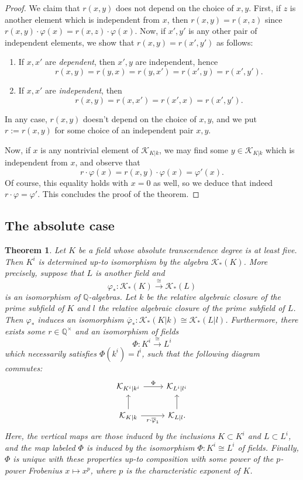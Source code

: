 \documentclass[12pt]{amsart}
\newcommand{\Qbb}{\mathbb{Q}}
\newcommand{\Kcal}{\mathcal{K}}
\renewcommand{\bar}{\overline}
\renewcommand{\phi}{\varphi}
\newtheorem{theorem}{Theorem}[section]
\theoremstyle{definition}
\begin{document}
\begin{proof}
  We claim that $r(x,y)$ does not depend on the choice of $x,y$.
  First, if $z$ is another element which is independent from $x$, then $r(x,y) = r(x,z)$ since $r(x,y) \cdot \phi(x) = r(x,z) \cdot \phi(x)$.
  Now, if $x',y'$ is any other pair of independent elements, we show that $r(x,y) = r(x',y')$ as follows:
  \begin{enumerate}
    \item If $x,x'$ are \emph{dependent}, then $x',y$ are independent, hence
          \[ r(x,y) = r(y,x) = r(y,x') = r(x',y) = r(x',y'). \]
    \item If $x,x'$ are \emph{independent}, then
          \[ r(x,y) = r(x,x') = r(x',x) = r(x',y'). \]
  \end{enumerate}
  In any case, $r(x,y)$ doesn't depend on the choice of $x,y$, and we put $r := r(x,y)$ for some choice of an independent pair $x,y$.

  Now, if $x$ is any nontrivial element of $\Kcal_{K|k}$, we may find some $y \in \Kcal_{K|k}$ which is independent from $x$, and observe that
  \[ r \cdot \phi(x) = r(x,y) \cdot \phi(x) = \phi'(x). \]
  Of course, this equality holds with $x = 0$ as well, so we deduce that indeed $r \cdot \phi = \phi'$.
  This concludes the proof of the theorem.
\end{proof}

\subsection{The absolute case}

\begin{theorem}\label{theorem:main_absolute_Kcal}
  Let $K$ be a field whose absolute transcendence degree is at least five.
  Then $K^{i}$ is determined up-to isomorphism by the algebra $\Kcal_{*}(K)$.
  More precisely, suppose that $L$ is another field and
  \[ \phi_{*} : \Kcal_{*}(K) \xrightarrow{\cong} \Kcal_{*}(L) \]
  is an isomorphism of $\Qbb$-algebras.
  Let $k$ be the relative algebraic closure of the prime subfield of $K$ and $l$ the relative algebraic closure of the prime subfield of $L$.
  Then $\phi_{*}$ induces an isomorphism $\bar\phi_{*} : \Kcal_{*}(K|k) \cong \Kcal_{*}(L|l)$.
  Furthermore, there exists some $r \in \Qbb^{\times}$ and an isomorphism of fields
  \[ \Phi : K^{i} \xrightarrow{\cong} L^{i} \]
  which necessarily satisfies $\Phi(k^{i}) = l^{i}$, such that the following diagram commutes:
  \[ \begin{tikzcd}
      \Kcal_{K^{i}|k^{i}} \ar[r,"\Phi"] & \Kcal_{L^{i}|l^{i}} \\
      \Kcal_{K|k} \ar[u] \ar[r,"r \cdot \bar\phi_{1}"'] & \Kcal_{L|l}. \ar[u]
    \end{tikzcd}\]
  Here, the vertical maps are those induced by the inclusions $K \subset K^{i}$ and $L \subset L^{i}$, and the map labeled $\Phi$ is induced by the isomorphism $\Phi : K^{i} \cong L^{i}$ of fields.
  Finally, $\Phi$ is unique with these properties up-to composition with some power of the $p$-power Frobenius $x \mapsto x^{p}$, where $p$ is the characteristic exponent of $K$.
\end{theorem}
\end{document}
